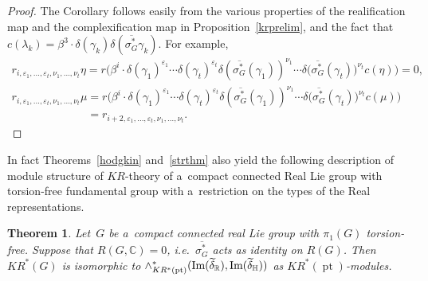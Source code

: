 \documentclass[pdftex]{sigma}
\numberwithin{equation}{section}
\newtheorem{Theorem}{Theorem}[section]
\DeclareMathOperator{\pt}{pt}
\begin{document}
\begin{proof}
The Corollary follows easily from the various properties of the realif\/ication map and the complexif\/ication map in
Proposition~\ref{krprelim}, and the fact that $c(\lambda_k)=\beta^3\cdot\delta(\gamma_k)\delta(\overline{\sigma_G^*}
\gamma_k)$.
For example,
\begin{gather*}
r_{i, \varepsilon_1, \dots, \varepsilon_t, \nu_1, \dots,
\nu_t}\eta=r\big(\beta^i\cdot\delta(\gamma_1)^{\varepsilon_1}\cdots\delta(\gamma_t)^{\varepsilon_t}\delta(\overline{\sigma_G^*}
(\gamma_1))^{\nu_1}\cdots\delta\big(\overline{\sigma_G^*}(\gamma_t)\big)^{\nu_t}c(\eta)\big)
=0,
\\
r_{i, \varepsilon_1, \dots, \varepsilon_t, \nu_1, \dots,\nu_t}\mu
=r\big(\beta^i\cdot\delta(\gamma_1)^{\varepsilon_1}\cdots\delta(\gamma_t)^{\varepsilon_t}\delta(\overline{\sigma_G^*}
(\gamma_1))^{\nu_1}\cdots\delta\big(\overline{\sigma_G^*}(\gamma_t)\big)^{\nu_t}c(\mu)\big)
\\
\phantom{r_{i, \varepsilon_1, \dots, \varepsilon_t, \nu_1, \dots,\nu_t}\mu}
=r_{i+2, \varepsilon_1, \dots, \varepsilon_t, \nu_1, \dots, \nu_t}.\tag*{\qed}
\end{gather*}
\renewcommand{\qed}{}
\end{proof}

In fact Theorems~\ref{hodgkin} and~\ref{strthm} also yield the following description of module structure of
$KR$-theory of a~compact connected Real Lie group with torsion-free fundamental group with a~restriction on the types of
the Real representations.
\begin{Theorem}
\label{spkrtheorymodofg}
Let~$G$ be a~compact connected real Lie group with $\pi_1(G)$ torsion-free.
Suppose that $R(G, \mathbb{C})=0$, i.e.\
$\overline{\sigma_G^*}$ acts as identity on $R(G)$.
Then $KR^*(G)$ is isomorphic to $\wedge_{KR^*(\pt)}^*(\text{\rm Im}(\widetilde{\delta}_\mathbb{R}),
\text{\rm Im}(\widetilde{\delta}_\mathbb{H}))$ as $KR^*(\pt)$-modules.
\end{Theorem}
\end{document}
